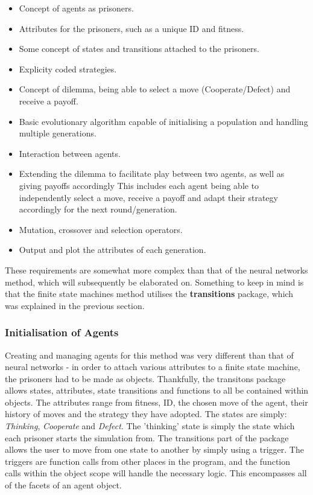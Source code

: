 \documentclass[12pt,a4paper]{article}
\begin{document}
\begin{itemize}
  \item Concept of agents as prisoners.
  \item Attributes for the prisoners, such as a unique ID and fitness.
  \item Some concept of states and transitions attached to the prisoners.
  \item Explicity coded strategies.
  \item Concept of dilemma, being able to select a move (Cooperate/Defect) and receive a payoff.
  \item Basic evolutionary algorithm capable of initialising a population and handling multiple generations.
  \item Interaction between agents.
  \item Extending the dilemma to facilitate play between two agents, as well as giving payoffs accordingly This includes each agent being able to independently select a move, receive a payoff
	and adapt their strategy accordingly for the next round/generation.
  \item Mutation, crossover and selection operators.
  \item Output and plot the attributes of each generation. \\
\end{itemize}

These requirements are somewhat more complex than that of the neural networks method, which will subsequently be elaborated on. Something to keep in mind is that the finite state machines method utilises the \textbf{transitions} package, which was explained in the previous section.

\subsubsection{Initialisation of Agents}
Creating and managing agents for this method was very different than that of neural networks - in order to attach various attributes to a finite state machine, the prisoners had to be made as objects. Thankfully, the transitons package allows states, attributes, state transitions and functions to all be contained within objects. The attributes range from fitness, ID, the chosen move of the agent, their history of moves and the strategy they have adopted. The states are simply: \textit{Thinking}, \textit{Cooperate} and \textit{Defect}. The 'thinking' state is simply the state which each prisoner starts the simulation from. The transitions part of the package allows the user to move from one state to another by simply using a trigger. The triggers are function calls from other places in the program, and the function calls within the object scope will handle the necessary logic. This encompasses all of the facets of an agent object.
\end{document}
